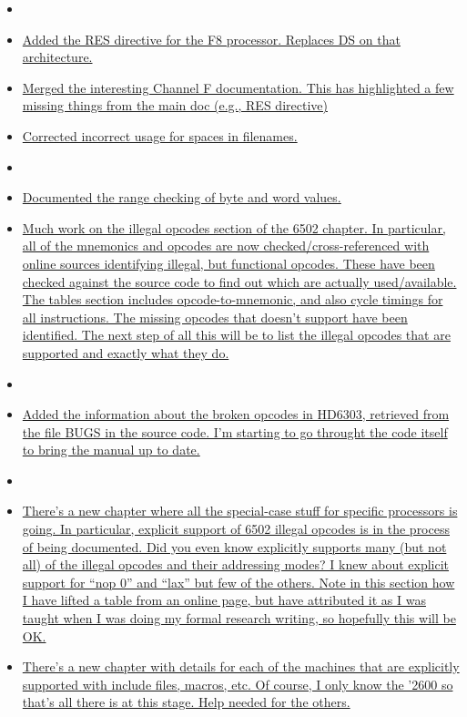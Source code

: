 \begin{itemize}
\item[]
\item \hyperref[changelog:20200906res]{Added the RES directive for the F8 processor. Replaces DS on that architecture.}
\item \hyperref[changelog:20200906f8]{Merged the interesting Channel F documentation. This has highlighted a few missing things from the main doc (e.g., RES directive)}
\item \hyperref[changelog:20200906spaces]{Corrected incorrect usage for spaces in filenames.}
\item[]
\item \hyperref[changelog:20200905range]{Documented the range checking of byte and word values.}
\item \hyperref[changelog:20200904illegal]{Much work on the illegal opcodes section of the 6502 chapter. In particular, all of the mnemonics and opcodes are now checked/cross-referenced with online sources identifying illegal, but functional opcodes. These have been checked against the \dasm source code to find out which are actually used/available. The tables section includes opcode-to-mnemonic, and also cycle timings for all instructions. The missing opcodes that \dasm doesn't support have been identified. The next step of all this will be to list the illegal opcodes that are supported and exactly what they do.}
\item[]
\item \hyperref[changelog:20200903bug]{Added the information about the broken opcodes in HD6303, retrieved from the file BUGS in the source code. I'm starting to go throught the code itself to bring the manual up to date.}
\item[]
\item \hyperref[changelog20200901_nop3]{There's a new chapter where all the special-case stuff for specific processors is going. In particular, explicit support of 6502 illegal opcodes is in the process of being documented. Did you even know \dasm explicitly supports many (but not all) of the illegal opcodes and their addressing modes? I knew about explicit support for ``nop 0'' and ``lax'' but few of the others. Note in this section how I have lifted a table from an online page, but have attributed it as I was taught when I was doing my formal research writing, so hopefully this will be OK.}
\item \hyperref[changelog20200901_nop3]{There's a new chapter with details for each of the machines that are explicitly supported with include files, macros, etc. Of course, I only know the '2600 so that's all there is at this stage. Help needed for the others.}

\end{itemize}

